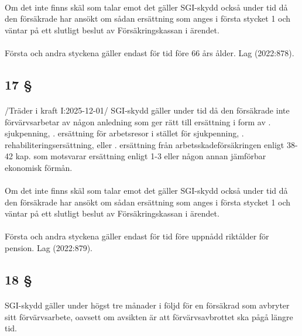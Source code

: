 \documentclass[a4paper,notitlepage,openany,10pt]{book}
\begin{document}
\paragraph*{}
Om det inte finns skäl som talar emot det gäller SGI-skydd också under tid då den försäkrade har ansökt om sådan ersättning som anges i första stycket 1 och väntar på ett slutligt beslut av Försäkringskassan i ärendet.
\paragraph*{}
Första och andra styckena gäller endast för tid före 66 års ålder.
Lag (2022:878).
\subsection*{17 §}
\paragraph*{}
/Träder i kraft I:2025-12-01/
SGI-skydd gäller under tid då den försäkrade inte förvärvsarbetar av någon anledning som ger rätt till ersättning i form av
. sjukpenning,
. ersättning för arbetsresor i stället för sjukpenning,
. rehabiliteringsersättning, eller
. ersättning från arbetsskadeförsäkringen enligt 38-42 kap. som motsvarar ersättning enligt 1-3 eller någon annan jämförbar ekonomisk förmån.
\paragraph*{}
Om det inte finns skäl som talar emot det gäller SGI-skydd också under tid då den försäkrade har ansökt om sådan ersättning som anges i första stycket 1 och väntar på ett slutligt beslut av Försäkringskassan i ärendet.
\paragraph*{}
Första och andra styckena gäller endast för tid före uppnådd riktålder för pension.
Lag (2022:879).
\subsection*{18 §}
\paragraph*{}
SGI-skydd gäller under högst tre månader i följd för en försäkrad som avbryter sitt förvärvsarbete, oavsett om avsikten är att förvärvsavbrottet ska pågå längre tid.
\end{document}
